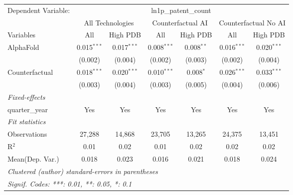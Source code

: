 \begingroup
\centering
\begin{tabular}{lcccccc}
   \tabularnewline \midrule \midrule
   Dependent Variable: & \multicolumn{6}{c}{ln1p\_patent\_count}\\
 & \multicolumn{2}{c}{All Technologies} & \multicolumn{2}{c}{Counterfactual AI} & \multicolumn{2}{c}{Counterfactual No AI} \\
\cmidrule(lr){1-1}\cmidrule(lr){2-3} \cmidrule(lr){4-5} \cmidrule(lr){6-7}
Variables & \multicolumn{1}{c}{All} & \multicolumn{1}{c}{High PDB} & \multicolumn{1}{c}{All} & \multicolumn{1}{c}{High PDB} & \multicolumn{1}{c}{All} & \multicolumn{1}{c}{High PDB} \\
\cmidrule(lr){1-1}\cmidrule(lr){2-2} \cmidrule(lr){3-3} \cmidrule(lr){4-4} \cmidrule(lr){5-5} \cmidrule(lr){6-6} \cmidrule(lr){7-7}
   AlphaFold      & 0.015$^{***}$ & 0.017$^{***}$ & 0.008$^{***}$ & 0.008$^{**}$ & 0.016$^{***}$ & 0.020$^{***}$\\   
                  & (0.002)       & (0.004)       & (0.002)       & (0.003)      & (0.002)       & (0.004)\\   
   Counterfactual & 0.018$^{***}$ & 0.020$^{***}$ & 0.010$^{***}$ & 0.008$^{*}$  & 0.026$^{***}$ & 0.033$^{***}$\\   
                  & (0.003)       & (0.004)       & (0.003)       & (0.005)      & (0.004)       & (0.006)\\   
   \midrule
   \emph{Fixed-effects}\\
   quarter\_year  & Yes           & Yes           & Yes           & Yes          & Yes           & Yes\\  
   \midrule
   \emph{Fit statistics}\\
   Observations   & 27,288        & 14,868        & 23,705        & 13,265       & 24,375        & 13,451\\  
   R$^2$          & 0.01          & 0.02          & 0.01          & 0.02         & 0.02          & 0.02\\  
Mean(Dep. Var.) & 0.018 & 0.023 & 0.016 & 0.021 & 0.018 & 0.024 \\
   \midrule \midrule
   \multicolumn{7}{l}{\emph{Clustered (author) standard-errors in parentheses}}\\
   \multicolumn{7}{l}{\emph{Signif. Codes: ***: 0.01, **: 0.05, *: 0.1}}\\
\end{tabular}
\par\endgroup
